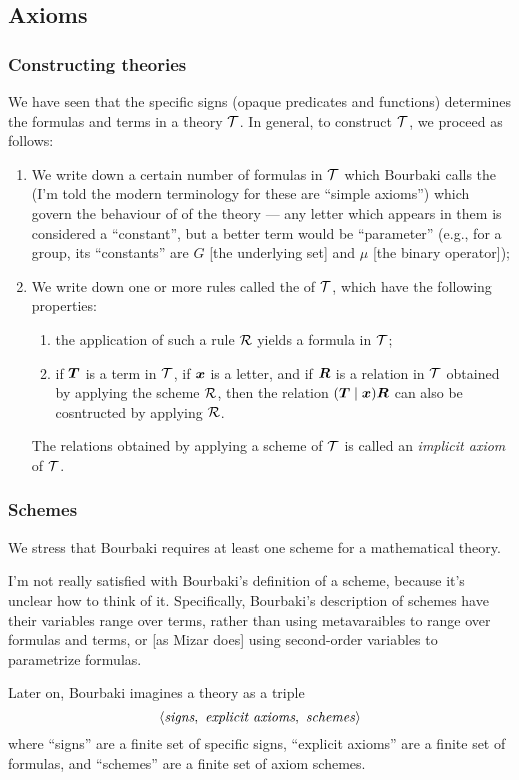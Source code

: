 \subsection{Axioms}

\subsubsection{Constructing theories}\label{subsec:axioms:constructing-theories}
We have seen that the specific signs (opaque predicates and functions)
determines the formulas and terms in a theory $\mathcal{T}$. In general,
to construct $\mathcal{T}$, we proceed as follows:
\begin{enumerate}
\item We write down a certain number of formulas in $\mathcal{T}$ which
  Bourbaki calls the  (I'm told the modern
  terminology for these are ``simple axioms'') which govern the
  behaviour of  of the theory --- any letter which
  appears in them is considered a ``constant'', but a better term would
  be ``parameter'' (e.g., for a group, its ``constants'' are $G$ [the
    underlying set] and $\mu$ [the binary operator]);
\item We write down one or more rules called the  of
  $\mathcal{T}$, which have the following properties:
  \begin{enumerate}
  \item the application of such a rule $\mathcal{R}$ yields a formula in $\mathcal{T}$;
  \item if $\boldsymbol{T}$ is a term in $\mathcal{T}$, if
    $\boldsymbol{x}$ is a letter, and if $\boldsymbol{R}$ is a
    relation in $\mathcal{T}$ obtained by applying the scheme
    $\mathcal{R}$, then the relation
    $(\boldsymbol{T}\mid\boldsymbol{x})\boldsymbol{R}$ can also be
    cosntructed by applying $\mathcal{R}$.
  \end{enumerate}
  The relations obtained by applying a scheme of $\mathcal{T}$ is called
  an \emph{implicit axiom} of $\mathcal{T}$.
\end{enumerate}

\subsubsection{Schemes}
We stress that Bourbaki requires at least one scheme for a mathematical
theory.

I'm not really satisfied with Bourbaki's definition of a scheme, because
it's unclear how to think of it. Specifically, Bourbaki's description of
schemes have their variables range over terms, rather than using
metavaraibles to range over formulas and terms, or [as Mizar does] using
second-order variables to parametrize formulas.

\begin{definition}
  Later on, Bourbaki imagines a theory as a triple
\[\langle\textit{signs},~\textit{explicit\ axioms},~\textit{schemes\/}\rangle\]
where ``signs'' are a finite set of specific signs, ``explicit axioms''
are a finite set of formulas, and ``schemes'' are a finite set of axiom
schemes.
\end{definition}
